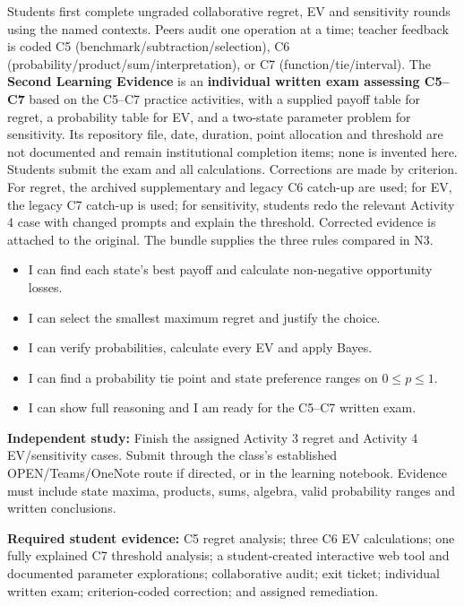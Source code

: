 \documentclass[10pt,letterpaper]{article}
\newcommand{\labelled}[2]{\textbf{#1:} #2\par}
\newcommand{\plansubsection}[1]{\Needspace{7\baselineskip}\par\vspace{5pt}{\normalsize\bfseries #1\par}\vspace{1pt}}
\newcommand{\partheading}[1]{\Needspace{7\baselineskip}\par\vspace{4pt}{\bfseries #1\par}}
\newcommand{\evidenceitem}[1]{\item[$\square$] #1}
\begin{document}
\partheading{Practice and Assessment---Second Learning Evidence}
Students first complete ungraded collaborative regret, EV and sensitivity
rounds using the named contexts. Peers audit one operation at a time; teacher
feedback is coded C5 (benchmark/subtraction/selection), C6
(probability/product/sum/interpretation), or C7 (function/tie/interval).
The \textbf{Second Learning Evidence} is an \textbf{individual written exam
assessing C5--C7} based on the C5--C7 practice activities, with a supplied payoff table for regret, a probability
table for EV, and a two-state parameter problem for sensitivity. Its repository
file, date, duration, point allocation and threshold are not documented and
remain institutional completion items; none is invented here. Students submit
the exam and all calculations. Corrections are made by criterion. For regret,
the archived supplementary and legacy C6 catch-up are used; for EV, the legacy
C7 catch-up is used; for sensitivity, students redo the relevant Activity 4
case with changed prompts and explain the threshold. Corrected evidence is
attached to the original. The bundle supplies the three rules compared in N3.

\partheading{Exit Ticket N2}
\begin{itemize}[leftmargin=1.8em,itemsep=1pt]
\evidenceitem{I can find each state's best payoff and calculate non-negative opportunity losses.}
\evidenceitem{I can select the smallest maximum regret and justify the choice.}
\evidenceitem{I can verify probabilities, calculate every EV and apply Bayes.}
\evidenceitem{I can find a probability tie point and state preference ranges on $0\leq p\leq1$.}
\evidenceitem{I can show full reasoning and I am ready for the C5--C7 written exam.}
\end{itemize}

\labelled{Independent study}{Finish the assigned Activity 3 regret and Activity 4 EV/sensitivity cases. Submit through the class's established OPEN/Teams/OneNote route if directed, or in the learning notebook. Evidence must include state maxima, products, sums, algebra, valid probability ranges and written conclusions.}
\labelled{Required student evidence}{C5 regret analysis; three C6 EV calculations; one fully explained C7 threshold analysis; a student-created interactive web tool and documented parameter explorations; collaborative audit; exit ticket; individual written exam; criterion-coded correction; and assigned remediation.}

\plansubsection{Pedagogical Action N3---Ranking Alternatives, Decision Trees and Real-World Application}
\end{document}
